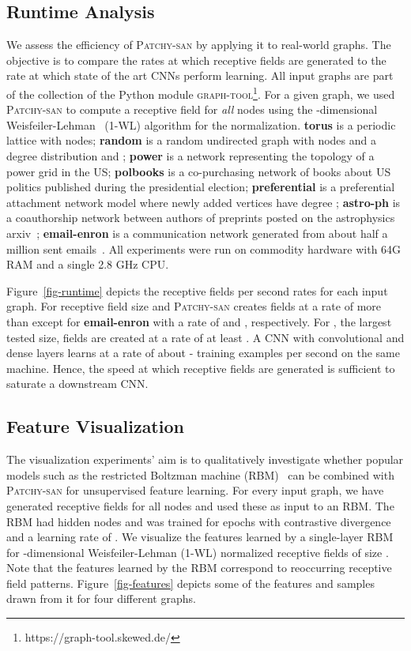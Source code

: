 \documentclass{article}
\begin{document}
\subsection{Runtime Analysis}
We assess the efficiency of \textsc{Patchy-san} by applying it to real-world graphs. The objective is to compare the rates at which receptive fields are generated to the rate at which state of the art CNNs perform learning. All input graphs are part of the collection of the Python module \textsc{graph-tool}\footnote{https://graph-tool.skewed.de/}. For a given graph, we used \textsc{Patchy-san} to compute a receptive field for \emph{all}  nodes using the -dimensional Weisfeiler-Lehman~\cite{douglas2011weisfeiler} (1-WL) algorithm for the normalization.  \textbf{torus} is a periodic lattice with  nodes; \textbf{random} is a random undirected graph with  nodes and a degree distribution  and ; \textbf{power} is a network representing the topology of a power grid in the US; \textbf{polbooks} is a co-purchasing network of books about US politics published during the  presidential election; \textbf{preferential} is a preferential attachment network model where newly added vertices have degree ; \textbf{astro-ph} is a coauthorship network between authors of preprints posted on the astrophysics arxiv~\cite{newman:2001}; \textbf{email-enron} is a communication network generated from about half a million sent emails~\cite{leskovec:2009}. All experiments were run on commodity hardware with 64G RAM and a single 2.8 GHz CPU. 

Figure~\ref{fig-runtime} depicts the receptive fields per second rates for each input graph. For receptive field size  and  \textsc{Patchy-san} creates fields at a rate of more than  except for \textbf{email-enron} with a rate of  and , respectively. For , the largest tested size, fields are created at a rate of at least . A CNN with  convolutional and  dense layers learns at a rate of about - training examples per second on the same machine. Hence, the speed at which receptive fields are generated is sufficient to saturate a downstream CNN. 


\subsection{Feature Visualization}

The visualization experiments' aim is to qualitatively investigate whether popular models such as the restricted Boltzman machine (RBM)~\cite{freund:1992} can be combined with \textsc{Patchy-san} for unsupervised feature learning.  For every input graph, we have generated receptive fields for all nodes and used these as input  to an RBM.  The RBM had  hidden nodes and was trained for  epochs with contrastive divergence and a learning rate of . We visualize the features learned by a single-layer RBM for -dimensional Weisfeiler-Lehman (1-WL) normalized receptive fields of size . Note that the features learned by the RBM correspond to reoccurring receptive field patterns. Figure~\ref{fig-features} depicts some of the features and samples drawn from it for four different graphs.
\end{document}
